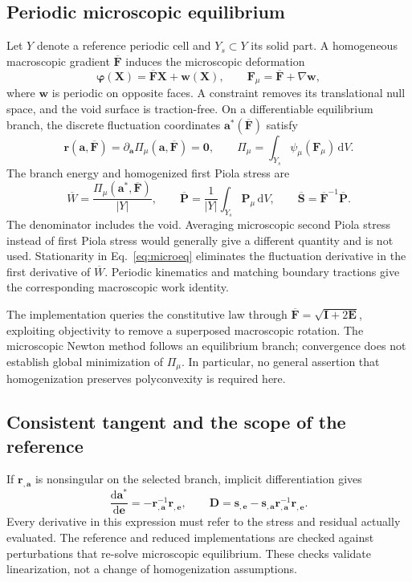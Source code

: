 \documentclass[10pt,a4paper]{article}
\newcommand{\F}{\bm F}
\newcommand{\E}{\bm E}
\newcommand{\Sg}{\bm S}
\newcommand{\I}{\bm I}
\newcommand{\ee}{\bm e}
\newcommand{\ssv}{\bm s}
\newcommand{\dd}{\mathrm d}
\begin{document}
\subsection{Periodic microscopic equilibrium}
Let $Y$ denote a reference periodic cell and $Y_s\subset Y$ its solid part. A homogeneous macroscopic gradient $\overline{\F}$ induces the microscopic deformation
\begin{equation}
 \bm\varphi(\bm X)=\overline{\F}\bm X+\bm w(\bm X),\qquad
 \F_\mu=\overline{\F}+\nabla\bm w,
\end{equation}
where $\bm w$ is periodic on opposite faces. A constraint removes its translational null space, and the void surface is traction-free. On a differentiable equilibrium branch, the discrete fluctuation coordinates $\bm a^*(\overline{\F})$ satisfy
\begin{equation}
 \bm r(\bm a,\overline{\F})=\partial_{\bm a}\Pi_\mu(\bm a,\overline{\F})=\bm0,
 \qquad
 \Pi_\mu=\int_{Y_s}\psi_\mu(\F_\mu)\,\dd V.
 \label{eq:microeq}
\end{equation}
The branch energy and homogenized first Piola stress are
\begin{equation}
 \overline W=\frac{\Pi_\mu(\bm a^*,\overline{\F})}{|Y|},\qquad
 \overline{\bm P}=\frac{1}{|Y|}\int_{Y_s}\bm P_\mu\,\dd V,
 \qquad \overline{\Sg}=\overline{\F}^{-1}\overline{\bm P}.
 \label{eq:homstress}
\end{equation}
The denominator includes the void. Averaging microscopic second Piola stress instead of first Piola stress would generally give a different quantity and is not used. Stationarity in Eq.~\eqref{eq:microeq} eliminates the fluctuation derivative in the first derivative of $\overline W$. Periodic kinematics and matching boundary tractions give the corresponding macroscopic work identity.

The implementation queries the constitutive law through $\overline{\F}=\sqrt{\I+2\E}$, exploiting objectivity to remove a superposed macroscopic rotation. The microscopic Newton method follows an equilibrium branch; convergence does not establish global minimization of $\Pi_\mu$. In particular, no general assertion that homogenization preserves polyconvexity is required here.

\subsection{Consistent tangent and the scope of the reference}
If $\bm r_{,\bm a}$ is nonsingular on the selected branch, implicit differentiation gives
\begin{equation}
 \frac{\dd\bm a^*}{\dd\ee}=-\bm r_{,\bm a}^{-1}\bm r_{,\ee},\qquad
 \bm D=\ssv_{,\ee}-\ssv_{,\bm a}\bm r_{,\bm a}^{-1}\bm r_{,\ee}.
 \label{eq:ift}
\end{equation}
Every derivative in this expression must refer to the stress and residual actually evaluated. The reference and reduced implementations are checked against perturbations that re-solve microscopic equilibrium. These checks validate linearization, not a change of homogenization assumptions.
\end{document}
